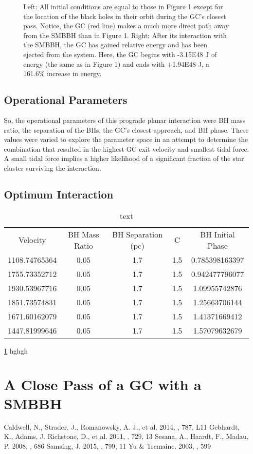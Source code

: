 \documentclass{aastex62}
\begin{document}
\begin{figure}

\caption{Left: All initial conditions are equal to those in Figure 1 except for the location of the black holes in their orbit during the GC's closest pass. Notice, the GC (red line) makes a much more direct path away from the SMBBH than in Figure 1. Right: After its interaction with the SMBBH, the GC has gained relative energy and has been ejected from the system. Here, the GC begins with -3.15E48 J of energy (the same as in Figure 1) and ends with +1.94E48 J, a 161.6\% increase in energy.}
\end{figure}
\subsection{Operational Parameters}
So, the operational parameters of this prograde planar interaction were BH mass ratio, the separation of the BHs, the GC's closest approach, and BH phase. These values were varied to explore the parameter space in an attempt to determine the combination that resulted in the highest GC exit velocity and smallest tidal force. A small tidal force implies a higher likelihood of a significant fraction of the star cluster surviving the interaction. 
\subsection{Optimum Interaction}
\begin{table}
\centering
\caption{text\label{key}}

\begin{tabular}{ccccc}
\hline \hline
Velocity & BH Mass Ratio & BH Separation (pc) & C & BH Initial Phase \\
1108.74765364 & 0.05 & 1.7 & 1.5 & 0.785398163397 \\
1755.73352712 & 0.05 & 1.7 & 1.5 & 0.942477796077 \\
1930.53967716 & 0.05 & 1.7 & 1.5 & 1.09955742876 \\
1851.73574831 & 0.05 & 1.7 & 1.5 & 1.25663706144 \\
1671.60162079 & 0.05 & 1.7 & 1.5 & 1.41371669412 \\
1447.81999646 & 0.05 & 1.7 & 1.5 & 1.57079632679
\end{tabular}
\end{table}
\ref{key} hghgh

\section{A Close Pass of a GC with a SMBBH}

\begin{thebibliography}{}
Caldwell, N., Strader, J., Romanowsky, A. J., et al. 2014, \apjl, 787, L11
Gebhardt, K., Adams, J. Richstone, D., et al. 2011, \apj, 729, 13
Sesana, A., Haardt, F., Madau, P. 2008, \apj, 686
Samsing, J. 2015, \apj, 799, 11
Yu \& Tremaine. 2003, \apj, 599
\end{thebibliography}
\end{document}
